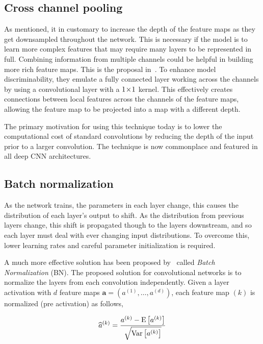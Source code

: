 \subsection{Cross channel pooling}
As mentioned, it in customary to increase the depth of the feature maps as they get downsampled throughout the network.
This is necessary if the model is to learn more complex features that may require many layers to be represented in full.
Combining information from multiple channels could be helpful in building more rich feature maps.
This is the proposal in\ \textcite{lin2014network}.
To enhance model discriminability, they emulate a fully connected layer working across the channels by using a convolutional layer with a \(1\!\times \! 1\) kernel.
This effectively creates connections between local features across the channels of the feature maps, allowing the feature map to be projected into a map with a different depth.

The primary motivation for using this technique today is to lower the computational cost of standard convolutions by reducing the depth of the input prior to a larger convolution.
The technique is now commonplace and featured in all deep CNN architectures.

\subsection{Batch normalization}
As the network trains, the parameters in each layer change, this causes the distribution of each layer’s output to shift.
As the distribution from previous layers change, this shift is propagated though to the layers downstream, and so each layer must deal with ever changing input distributions.
To overcome this, lower learning rates and careful parameter initialization is required.

A much more effective solution has been proposed by\ \textcite{ioffe2015batch} called \textit{Batch Normalization} (BN).
The proposed solution for convolutional networks is to normalize the layers from each convolution independently. Given a layer activation with \(d\) feature maps \(\mathbf{a}=\left(a^{(1)},\dots,a^{(d)}\right)\), each feature map \((k)\) is normalized (pre activation) as follows,

\begin{equation*}
  \widehat{a}^{(k)}=\frac{a^{(k)}-\text{E}\left[a^{(k)}\right]}{\sqrt{\text{Var}\left[a^{(k)}\right]}}
\end{equation*}

